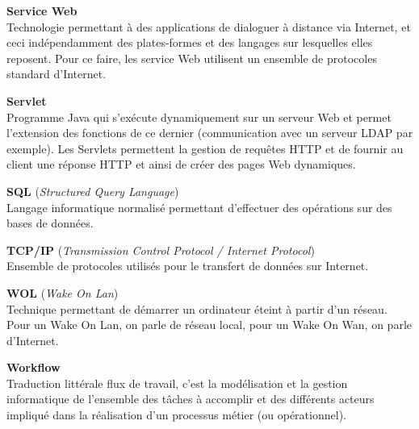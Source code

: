 \vspace{0.5cm}

\textbf{Service Web}\\
Technologie permettant \`a des applications de dialoguer \`a distance via Internet, et ceci ind\'ependamment des plates-formes et des langages sur lesquelles elles reposent.
Pour ce faire, les service Web utilisent un ensemble de protocoles standard d'Internet.

\vspace{0.5cm}

\textbf{Servlet}\\
Programme Java qui s'ex\'ecute dynamiquement sur un serveur Web et permet l'extension des fonctions de ce dernier (communication avec un serveur LDAP par exemple).
Les Servlets permettent la gestion de requ\^etes HTTP et de fournir au client une r\'eponse HTTP et ainsi de cr\'eer des pages Web dynamiques.

\vspace{0.5cm}

\textbf{SQL} (\textit{Structured Query Language})\\
Langage informatique normalis\'e permettant d'effectuer des op\'erations sur des bases de donn\'ees.

\vspace{0.5cm}

\textbf{TCP/IP} (\textit{Transmission Control Protocol / Internet Protocol})\\
Ensemble de protocoles utilis\'es pour le transfert de donn\'ees sur Internet.

\vspace{0.5cm}

\textbf{WOL} (\textit{Wake On Lan})\\
Technique permettant de d\'emarrer un ordinateur \'eteint \`a partir d'un r\'eseau. 
Pour un Wake On Lan, on parle de r\'eseau local, pour un Wake On Wan, on parle d'Internet.

\vspace{0.5cm}

\textbf{Workflow}\\
Traduction litt\'erale \og{}flux de travail\fg{}, c'est la mod\'elisation et la gestion informatique de l'ensemble des t\^aches \`a accomplir et des diff\'erents acteurs impliqu\'e dans la r\'ealisation d'un processus m\'etier (ou op\'erationnel).

\clearpage
